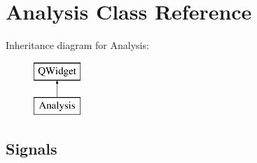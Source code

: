\hypertarget{class_analysis}{}\section{Analysis Class Reference}
\label{class_analysis}
Inheritance diagram for Analysis\+:\begin{figure}[H]
\begin{center}
\leavevmode
\includegraphics[height=2.000000cm]{class_analysis}
\end{center}
\end{figure}
\subsection*{Signals}
